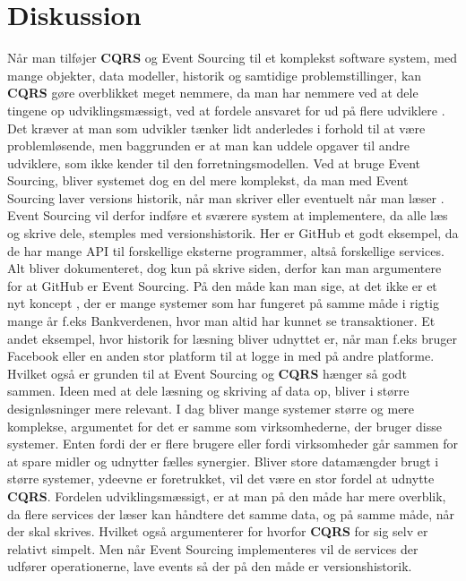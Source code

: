 \chapter{Diskussion}
Når man tilføjer \textbf{CQRS} og Event Sourcing til et komplekst software system, med mange objekter, data modeller, historik og samtidige problemstillinger, kan \textbf{CQRS} gøre overblikket meget nemmere, da man har nemmere ved at dele tingene op udviklingsmæssigt, ved at fordele ansvaret for ud på flere udviklere .
Det kræver at man som udvikler tænker lidt anderledes i forhold til at være problemløsende, men baggrunden er at man kan uddele opgaver til andre udviklere, som ikke kender til den forretningsmodellen.
Ved at bruge Event Sourcing, bliver systemet dog en del mere komplekst, da man med Event Sourcing laver versions historik, når man skriver eller eventuelt når man læser . Event Sourcing vil derfor indføre et sværere system at implementere, da alle læs og skrive dele, stemples med versionshistorik. Her er GitHub et godt eksempel, da de har mange API til forskellige eksterne programmer, altså forskellige services. Alt bliver dokumenteret, dog kun på skrive siden, derfor kan man argumentere for at GitHub er Event Sourcing.
På den måde kan man sige, at det ikke er et nyt koncept , der er mange systemer som har fungeret på samme måde i rigtig mange år f.eks Bankverdenen, hvor man altid har kunnet se transaktioner. Et andet eksempel, hvor historik for læsning bliver udnyttet er, når man f.eks bruger Facebook eller en anden stor platform til at logge in med på andre platforme.
Hvilket også er grunden til at Event Sourcing og \textbf{CQRS} hænger så godt sammen.
\newline
\newline
Ideen med at dele læsning og skriving af data op, bliver i større designløsninger mere relevant. 
I dag bliver mange systemer større og mere komplekse, argumentet for det er samme som virksomhederne, der bruger disse systemer. Enten fordi der er flere brugere eller fordi virksomheder går sammen for at spare midler og udnytter fælles synergier.
Bliver store datamængder brugt i større systemer, ydeevne er foretrukket, vil det være en stor fordel at udnytte \textbf{CQRS}. Fordelen udviklingsmæssigt, er at man på den måde har mere overblik, da flere services der læser kan håndtere det samme data, og på samme måde, når der skal skrives. Hvilket også argumenterer for hvorfor \textbf{CQRS} for sig selv er relativt simpelt. Men når Event Sourcing implementeres vil de services der udfører operationerne, lave events så der på den måde er versionshistorik.
